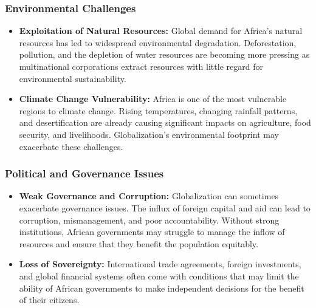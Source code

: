 \documentclass[10pt]{article}
\begin{document}
\subsubsection*{Environmental Challenges}
\begin{itemize}
  \item \textbf{Exploitation of Natural Resources:} Global demand for Africa's natural resources
    has led to widespread environmental degradation. Deforestation, pollution, and
    the depletion of water resources are becoming more pressing as multinational
    corporations extract resources with little regard for environmental sustainability.

  \item \textbf{Climate Change Vulnerability:} Africa is one of the most vulnerable regions to
    climate change. Rising temperatures, changing rainfall patterns, and
    desertification are already causing significant impacts on agriculture, food
    security, and livelihoods. Globalization's environmental footprint may exacerbate
    these challenges.
\end{itemize}

\subsubsection*{Political and Governance Issues}
\begin{itemize}
  \item \textbf{Weak Governance and Corruption:} Globalization can sometimes exacerbate
    governance issues. The influx of foreign capital and aid can lead to corruption,
    mismanagement, and poor accountability. Without strong institutions, African
    governments may struggle to manage the inflow of resources and ensure that
    they benefit the population equitably.

  \item \textbf{Loss of Sovereignty:} International trade agreements, foreign investments, and
    global financial systems often come with conditions that may limit the ability of
    African governments to make independent decisions for the benefit of their
    citizens.
\end{itemize}
\end{document}

